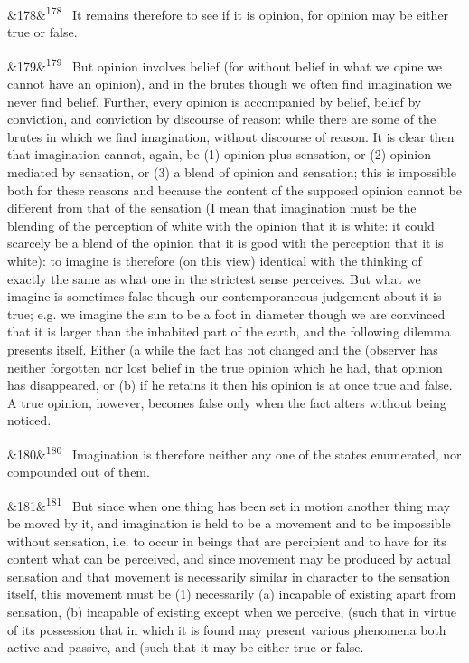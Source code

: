 \documentclass[12pt]{article}
\newcommand{\para}[1][]{\par\noindent\ifx&#1&\else\textsuperscript{\footnotesize #1}~\fi}
\begin{document}
\para[178] It remains therefore to see if it is opinion, for opinion may be either true or false.

\para[179] But opinion involves belief (for without belief in what we opine we cannot have an opinion), and in the brutes though we often find imagination we never find belief. Further, every opinion is accompanied by belief, belief by conviction, and conviction by discourse of reason: while there are some of the brutes in which we find imagination, without discourse of reason. It is clear then that imagination cannot, again, be (1) opinion plus sensation, or (2) opinion mediated by sensation, or (3) a blend of opinion and sensation; this is impossible both for these reasons and because the content of the supposed opinion cannot be different from that of the sensation (I mean that imagination must be the blending of the perception of white with the opinion that it is white: it could scarcely be a blend of the opinion that it is good with the perception that it is white): to imagine is therefore (on this view) identical with the thinking of exactly the same as what one in the strictest sense perceives. But what we imagine is sometimes false though our contemporaneous judgement about it is true; e.g. we imagine the sun to be a foot in diameter though we are convinced that it is larger than the inhabited part of the earth, and the following dilemma presents itself. Either (a while the fact has not changed and the (observer has neither forgotten nor lost belief in the true opinion which he had, that opinion has disappeared, or (b) if he retains it then his opinion is at once true and false. A true opinion, however, becomes false only when the fact alters without being noticed.

\para[180] Imagination is therefore neither any one of the states enumerated, nor compounded out of them.

\para[181] But since when one thing has been set in motion another thing may be moved by it, and imagination is held to be a movement and to be impossible without sensation, i.e. to occur in beings that are percipient and to have for its content what can be perceived, and since movement may be produced by actual sensation and that movement is necessarily similar in character to the sensation itself, this movement must be (1) necessarily (a) incapable of existing apart from sensation, (b) incapable of existing except when we perceive, (such that in virtue of its possession that in which it is found may present various phenomena both active and passive, and (such that it may be either true or false.
\end{document}
